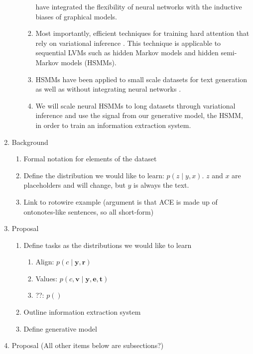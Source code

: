 \documentclass[11pt]{article}
\newcommand{\be}{\mathbf{e}}
\newcommand{\br}{\mathbf{r}}
\newcommand{\bt}{\mathbf{t}}
\newcommand{\bv}{\mathbf{v}}
\newcommand{\by}{\mathbf{y}}
\begin{document}
\begin{enumerate}
\begin{enumerate}
\begin{enumerate}
            have integrated the flexibility of neural networks with the
            inductive biases of graphical models.
        \item Most importantly, efficient techniques for training hard attention 
            that rely on variational inference \citep{deng2018attn}.
            This technique is applicable to sequential LVMs such as hidden Markov models 
            and hidden semi-Markov models (HSMMs).
        \item HSMMs have been applied to small scale datasets for text generation \citep{wiseman2018template}
            as well as without integrating neural networks \citep{liang2009semalign}.
        \item We will scale neural HSMMs to long datasets through variational inference and use
            the signal from our generative model, the HSMM, in order to train an information extraction system.
        \end{enumerate}
    \end{enumerate}
\item Background
    \begin{enumerate}
    \item Formal notation for elements of the dataset
    \item Define the distribution we would like to learn: $p(z\mid y, x)$.
        $z$ and $x$ are placeholders and will change, but $y$ is always the text.
    \item Link to rotowire example
        (argument is that ACE is made up of ontonotes-like sentences, so all short-form)
    \end{enumerate}
\item Proposal
    \begin{enumerate}
    \item Define tasks as the distributions we would like to learn
        \begin{enumerate}
        \item Align: $p(c\mid\by,\br)$
        \item Values: $p(c,\bv\mid\by,\be,\bt)$
        \item ??: $p()$
        \end{enumerate}
    \item Outline information extraction system
    \item Define generative model
    \end{enumerate}
\item Proposal (All other items below are subsections?)
    \begin{enumerate}

\end{enumerate}
\end{enumerate}
\end{document}
